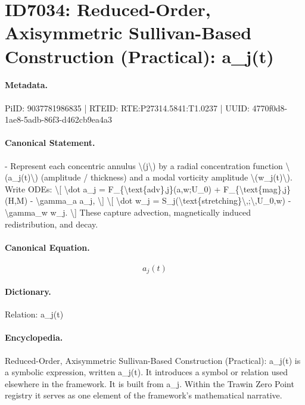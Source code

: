 \section*{ID7034: Reduced-Order, Axisymmetric Sullivan-Based Construction (Practical): a\_j(t)}
\paragraph{Metadata.}
PiID: 9037781986835 | RTEID: RTE:P27314.5841:T1.0237 | UUID: 4770f0d8-1ae8-5adb-86f3-d462cb9ea4a3

\paragraph{Canonical Statement.}
- Represent each concentric annulus \textbackslash{}(j\textbackslash{}) by a radial concentration function \textbackslash{}(a\_j(t)\textbackslash{}) (amplitude / thickness) and a modal vorticity amplitude \textbackslash{}(w\_j(t)\textbackslash{}). Write ODEs: \textbackslash{}[ \textbackslash{}dot a\_j = F\_\{\textbackslash{}text\{adv\},j\}(a,w;U\_0) + F\_\{\textbackslash{}text\{mag\},j\}(H,M) - \textbackslash{}gamma\_a a\_j, \textbackslash{}] \textbackslash{}[ \textbackslash{}dot w\_j = S\_j(\textbackslash{}text\{stretching\}\textbackslash{},;\textbackslash{},U\_0,w) - \textbackslash{}gamma\_w w\_j. \textbackslash{}] These capture advection, magnetically induced redistribution, and decay.

\paragraph{Canonical Equation.}
\[
a_j(t)
\]

\paragraph{Dictionary.}
Relation: a\_j(t)

\paragraph{Encyclopedia.}
Reduced-Order, Axisymmetric Sullivan-Based Construction (Practical): a\_j(t) is a symbolic expression, written a\_j(t). It introduces a symbol or relation used elsewhere in the framework. It is built from a\_j. Within the Trawin Zero Point registry it serves as one element of the framework's mathematical narrative.
